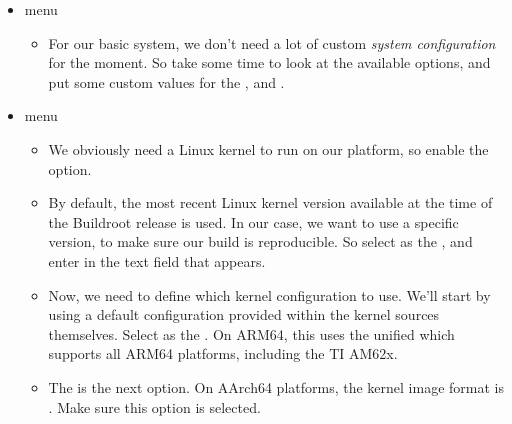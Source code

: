 \begin{itemize}
\begin{itemize}
  \item Select  as the . It
    will automatically select the  variant, which is fine for our needs. Buildroot can
    either use pre-defined toolchains such as the ones provided by ARM
    or Bootlin, or custom toolchains (either downloaded from a given
    location, or pre-installed on your machine).

  \end{itemize}

\item {} menu

  \begin{itemize}

  \item For our basic system, we don't need a lot of custom {\em
      system configuration} for the moment. So take some time to look
    at the available options, and put some custom values for the
    ,  and .

  \end{itemize}

\item {} menu

  \begin{itemize}

  \item We obviously need a Linux kernel to run on our platform, so
    enable the  option.

  \item By default, the most recent Linux kernel version available at
    the time of the Buildroot release is used. In our case, we want to
    use a specific version, to make sure our build is reproducible. So
    select  as the , and
    enter  in the  text field that
    appears.

  \item Now, we need to define which kernel configuration to
    use. We'll start by using a default configuration provided within
    the kernel sources themselves. Select  as the . On
    ARM64, this uses the unified  which supports all
    ARM64 platforms, including the TI AM62x.

  \item The  is the next option. On AArch64
    platforms, the kernel image format is . Make sure this
    option is selected.


\end{itemize}
\end{itemize}
